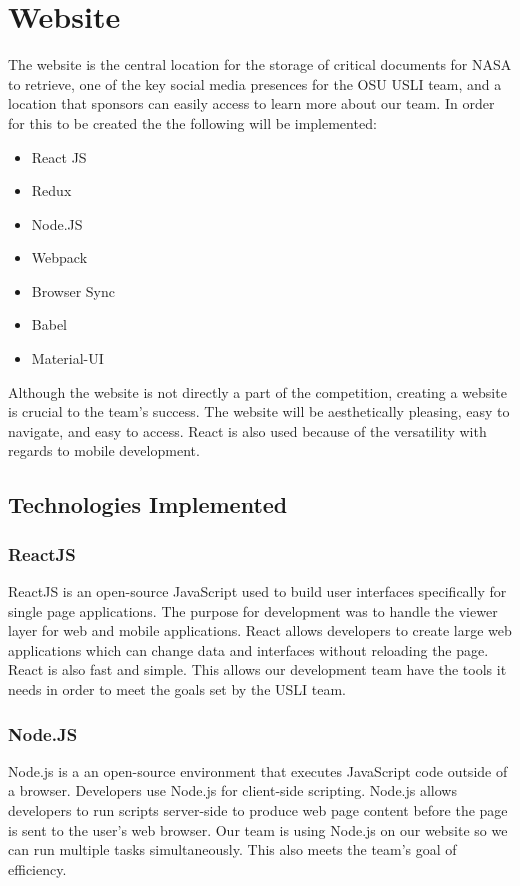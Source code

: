 \documentclass[journal,10pt,draftclsnofoot,onecolumn,compsoc]{IEEEtran} \usepackage[margin=0.75in]{geometry}
\begin{document}
\newpage
\section{Website}
The website is the central location for the storage of critical documents for NASA to retrieve, one of the key social media presences for the OSU USLI team, and a location that sponsors can easily access to learn more about our team. In order for this to be created the the following will be implemented: 
\begin{itemize}
    \item React JS
    \item Redux
    \item Node.JS
    \item Webpack
    \item Browser Sync
    \item Babel
    \item Material-UI
\end{itemize}
Although the website is not directly a part of the competition, creating a website is crucial to the team's success. The website will be aesthetically pleasing, easy to navigate, and easy to access. React is also used because of the versatility with regards to mobile development.  

\subsection{Technologies Implemented}
\subsubsection{ReactJS}
ReactJS is an open-source JavaScript used to build user interfaces specifically for single page applications. The purpose for development was to handle the viewer layer for web and mobile applications. React allows developers to create large web applications which can change data and interfaces without reloading the page. React is also fast and simple. This allows our development team have the tools it needs in order to meet the goals set by the USLI team. 
\subsubsection{Node.JS}
Node.js is a an open-source environment that executes JavaScript code outside of a browser. Developers use Node.js for client-side scripting. Node.js allows developers to run scripts server-side to produce web page content before the page is sent to the user's web browser. Our team is using Node.js on our website so we can run multiple tasks simultaneously. This also meets the team's goal of efficiency. 
\end{document}
